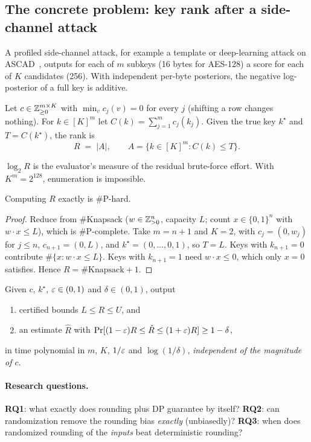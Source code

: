 \subsection{The concrete problem: key rank after a side-channel attack}
A profiled side-channel attack, for example a template or deep-learning attack on
ASCAD~\cite{benadjila2020}, outputs for each of $m$ subkeys (16 bytes for AES-128) a score for
each of $K$ candidates (256). With independent per-byte posteriors, the negative
log-posterior of a full key is additive.

\begin{definition}
Let $c\in\mathbb{Z}_{\ge0}^{m\times K}$ with $\min_v c_j(v)=0$ for every $j$ (shifting a row changes nothing).
For $k\in[K]^m$ let $C(k)=\sum_{j=1}^m c_j(k_j)$. Given the true key $k^\star$ and
$T=C(k^\star)$, the rank is
\[ R \;=\; |A|,\qquad A=\{k\in[K]^m : C(k)\le T\}. \]
\end{definition}
$\log_2 R$ is the evaluator's measure of the residual brute-force effort. With $K^m=2^{128}$,
enumeration is impossible.

\begin{proposition}[Hardness]\label{prop:hard}
Computing $R$ exactly is \#P-hard.
\end{proposition}
\begin{proof}
Reduce from \#Knapsack ($w\in\mathbb{Z}_{>0}^n$, capacity $L$; count $x\in\{0,1\}^n$ with $w\cdot x\le L$),
which is \#P-complete. Take $m=n+1$ and $K=2$, with $c_j=(0,w_j)$ for $j\le n$, $c_{n+1}=(0,L)$, and
$k^\star=(0,\dots,0,1)$, so $T=L$. Keys with $k_{n+1}=0$ contribute $\#\{x: w\cdot x\le L\}$.
Keys with $k_{n+1}=1$ need $w\cdot x\le 0$, which only $x=0$ satisfies. Hence $R=\#\text{Knapsack}+1$.
\end{proof}

\begin{problem}\label{prob:main}
Given $c$, $k^\star$, $\varepsilon\in(0,1)$ and $\delta\in(0,1)$, output
\begin{enumerate}[nosep]
\item certified bounds $L\le R\le U$, and
\item an estimate $\hat R$ with $\Pr[(1-\varepsilon)R\le\hat R\le(1+\varepsilon)R]\ge1-\delta$,
\end{enumerate}
in time polynomial in $m$, $K$, $1/\varepsilon$ and $\log(1/\delta)$, \emph{independent of the magnitude of $c$}.
\end{problem}

\paragraph{Research questions.}
\textbf{RQ1}: what exactly does rounding plus DP guarantee by itself?
\textbf{RQ2}: can randomization remove the rounding bias \emph{exactly} (unbiasedly)?
\textbf{RQ3}: when does randomized rounding of the \emph{inputs} beat deterministic rounding?

